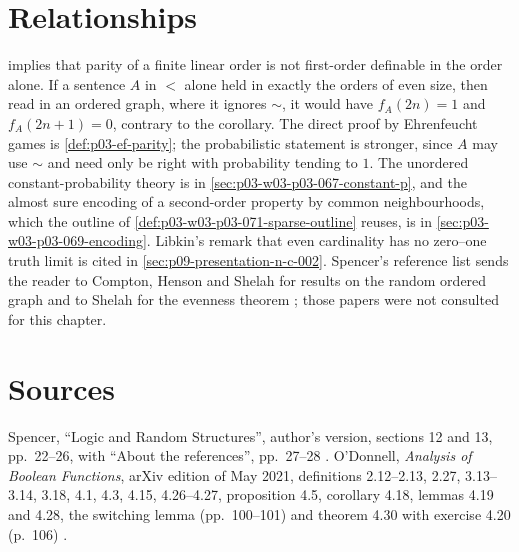 \section{Relationships}
\label{sec:p03-w03-p03-071-relationships}

 implies that parity of a finite linear
order is not first-order definable in the order alone.  If a sentence
\(A\) in \(<\) alone held in exactly the orders of even size, then read in
an ordered graph, where it ignores \(\sim\), it would have
\(f_A(2n)=1\) and \(f_A(2n+1)=0\), contrary to the corollary.  The direct
proof by Ehrenfeucht games is \cref{def:p03-ef-parity}; the probabilistic
statement is stronger, since \(A\) may use \(\sim\) and need only be right
with probability tending to \(1\).  The unordered constant-probability
theory is in \cref{sec:p03-w03-p03-067-constant-p}, and the almost sure
encoding of a second-order property by common neighbourhoods, which the
outline of \cref{def:p03-w03-p03-071-sparse-outline} reuses, is in
\cref{sec:p03-w03-p03-069-encoding}.  Libkin's remark that even cardinality
has no zero--one truth limit is cited in \cref{sec:p09-presentation-n-c-002}.
Spencer's reference list sends the reader to Compton, Henson and Shelah for
results on the random ordered graph and to Shelah for the evenness theorem
\cite[p.~28]{Spencer2007LogicRandomStructuresAuthor}; those papers were not
consulted for this chapter.

\section{Sources}
\label{sec:p03-w03-p03-071-sources}

Spencer, ``Logic and Random Structures'', author's version, sections 12 and
13, pp.~22--26, with ``About the references'', pp.~27--28
\cite{Spencer2007LogicRandomStructuresAuthor}.  O'Donnell, \emph{Analysis
of Boolean Functions}, arXiv edition of May 2021, definitions 2.12--2.13,
2.27, 3.13--3.14, 3.18, 4.1, 4.3, 4.15, 4.26--4.27, proposition 4.5,
corollary 4.18, lemmas 4.19 and 4.28, the switching lemma (pp.~100--101) and
theorem 4.30 with exercise 4.20 (p.~106) \cite{ODonnell2021AnalysisBooleanArxiv}.
